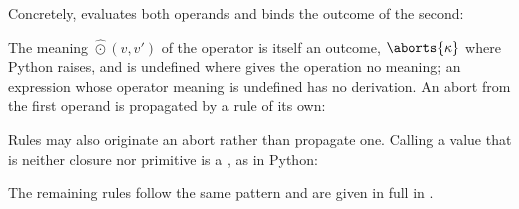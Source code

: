 Concretely,  evaluates both operands and binds the outcome of the second:
\begin{mathpar}

\end{mathpar}
The meaning $\hat{\odot}(v, v')$ of the operator is itself an outcome, $\aborts{\kappa}$ where Python
raises, and is undefined where \PurePy gives the operation no meaning; an expression whose operator
meaning is undefined has no derivation. An abort from the first operand is propagated by a rule of its own:
\begin{mathpar}

\end{mathpar}
Rules may also originate an abort rather than propagate one. Calling a value that is neither closure nor
primitive is a , as in Python:
\begin{mathpar}

\end{mathpar}
The remaining rules follow the same pattern and are given in full in \specification.
